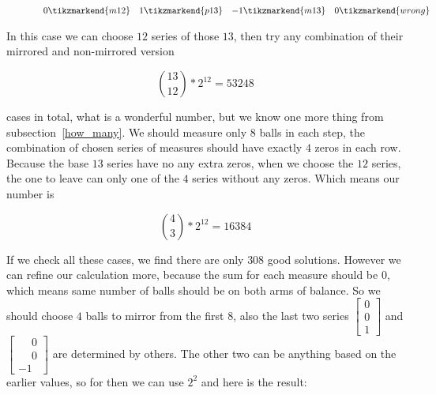 \documentclass[11pt]{article} %
\begin{document}
\begin{figure}[h]
\[\begin{array}{rrrrrrrrr}
 0 \tikzmarkend{m12} &
 1 \tikzmarkend{p13} &
-1 \tikzmarkend{m13} &
 0 \tikzmarkend{wrong} 
\end{array}
\]
\end{figure}

In this case we can choose $12$ series of those $13$, then try any combination of their mirrored and non-mirrored version

\[ \binom{13}{12}*2^{12} = 53248 \]

cases in total, what is a wonderful number, but we know one more thing from subsection~\ref{how_many}. We should measure only $8$ balls in each step, the combination of chosen series of measures should have exactly $4$ zeros in each row. Because the base $13$ series have no any extra zeros, when we choose the $12$ series, the one to leave can only one of the $4$ series without any zeros. Which means our number is

\[ \binom{4}{3}*2^{12} = 16384 \]

If we check all these cases, we find there are only $308$ good solutions. However we can refine our calculation more, because the sum for each measure should be $0$, which means same number of balls should be on both arms of balance. So we should choose $4$ balls to mirror from the first $8$, also the last two series $\left[\begin{smallmatrix}0\\0\\1\end{smallmatrix}\right]$ and $\left[\begin{smallmatrix}\phantom{{}-{}}0\\\phantom{{}-{}}0\\-1\end{smallmatrix}\right]$ are determined by others. The other two can be anything based on the earlier values, so for then we can use $2^2$ and here is the result:
\end{document}

